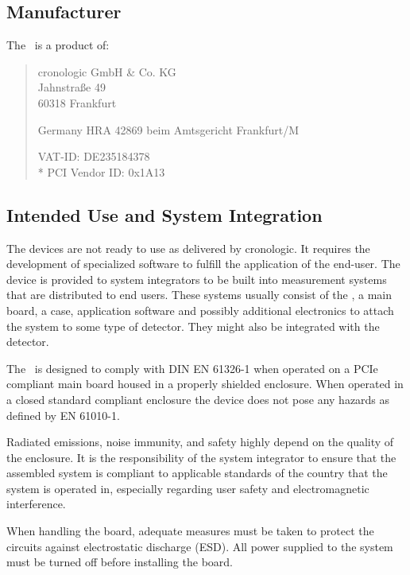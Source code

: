 \subsection{Manufacturer\label{cp:manu}}

The \deviceName\ is a product of:\

\begin{quote}
    cronologic GmbH \& Co. KG\\
    Jahnstra\ss{}e 49\\
    60318 Frankfurt\par
    Germany
    \noindent HRA 42869 beim Amtsgericht Frankfurt/M\par
    \noindent VAT-ID: DE235184378 \\*
    \noindent PCI Vendor ID: 0x1A13
\end{quote}

\subsection{Intended Use and System Integration}
The devices are not ready to use as delivered by cronologic. It requires the
development of specialized software to fulfill the application of the
end-user. The device is provided to system integrators to be built into
measurement systems that are distributed to end users. These systems usually
consist of the \deviceName, a main board, a case, application software and
possibly additional electronics to attach the system to some type of detector.
They might also be integrated with the detector.\par

The \deviceName\ is designed to comply with DIN EN 61326-1 when operated on a
PCIe compliant main board housed in a properly shielded enclosure.  When
operated in a closed standard compliant enclosure the device does not pose any
hazards as defined by EN 61010-1.\par

Radiated emissions, noise immunity, and safety highly depend on the quality of
the enclosure.  It is the responsibility of the system integrator to ensure
that the assembled system is compliant to applicable standards of the country
that the system is operated in, especially regarding user safety and
electromagnetic interference. \par
    
When handling the board, adequate measures must be taken to protect the
circuits against electrostatic discharge (ESD). All power supplied to the
system must be turned off before installing the board.

